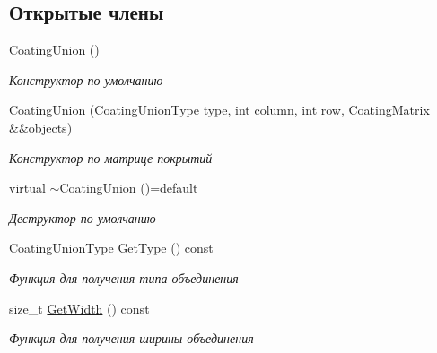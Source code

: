 \subsection*{Открытые члены}
\begin{DoxyCompactItemize}
\item 
\mbox{\label{classrtm_1_1_coating_union_aada3c299db0c6604b8a713d2ae87afbb}} 
\hyperlink{classrtm_1_1_coating_union_aada3c299db0c6604b8a713d2ae87afbb}{Coating\+Union} ()
\begin{DoxyCompactList}\small\item\em Конструктор по умолчанию \end{DoxyCompactList}\item 
\hyperlink{classrtm_1_1_coating_union_ad5c97fb37269028e9058c37c10428255}{Coating\+Union} (\hyperlink{namespacertm_a6a0d424be5696f64038e5e84a79cabfa}{Coating\+Union\+Type} type, int column, int row, \hyperlink{namespacertm_ae3bb29510cfde424975be31866d2486e}{Coating\+Matrix} \&\&objects)
\begin{DoxyCompactList}\small\item\em Конструктор по матрице покрытий \end{DoxyCompactList}\item 
\mbox{\label{classrtm_1_1_coating_union_a42d7554ae47b709c6518b84a9afe9a70}} 
virtual \hyperlink{classrtm_1_1_coating_union_a42d7554ae47b709c6518b84a9afe9a70}{$\sim$\+Coating\+Union} ()=default
\begin{DoxyCompactList}\small\item\em Деструктор по умолчанию \end{DoxyCompactList}\item 
\hyperlink{namespacertm_a6a0d424be5696f64038e5e84a79cabfa}{Coating\+Union\+Type} \hyperlink{classrtm_1_1_coating_union_a6e679033a648837c2df2b3b1ea749efd}{Get\+Type} () const
\begin{DoxyCompactList}\small\item\em Функция для получения типа объединения \end{DoxyCompactList}\item 
size\+\_\+t \hyperlink{classrtm_1_1_coating_union_aca7956667dce60916e9cd225694a2818}{Get\+Width} () const
\begin{DoxyCompactList}\small\item\em Функция для получения ширины объединения \end{DoxyCompactList}\item 

\end{DoxyCompactItemize}
